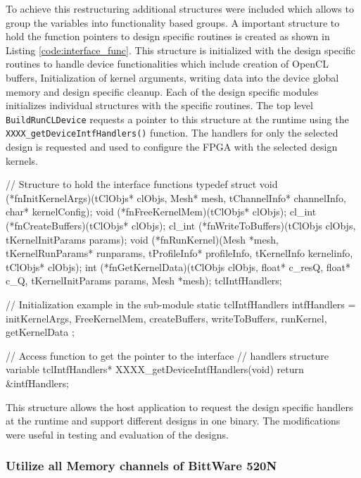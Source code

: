To achieve this restructuring additional structures were included which allows to
group the variables into functionality based groups. A important structure
to hold the function pointers to design specific routines is created
as shown in Listing \ref{code:interface_func}. This structure is initialized
with the design specific routines to handle device functionalities which
include creation of OpenCL buffers, Initialization of kernel arguments,
writing data into the device global memory and design specific cleanup.
Each of the design specific modules initializes individual structures
with the specific routines. The top level \texttt{BuildRunCLDevice} requests
a pointer to this structure at the runtime using the \texttt{XXXX\_getDeviceIntfHandlers()}
function. The handlers for only the selected design is requested and used to configure the
FPGA with the selected design kernels.
\begin{CppCode}[caption=Structure to hold the design specific interface function pointers
    and initialization example, frame=tlrb, label=code:interface_func, float]
// Structure to hold the interface functions
typedef struct
{
    void (*fnInitKernelArgs)(tClObjs* clObjs, Mesh* mesh, tChannelInfo* channelInfo,
                             char* kernelConfig);
    void (*fnFreeKernelMem)(tClObjs* clObjs);
    cl_int (*fnCreateBuffers)(tClObjs* clObjs);
    cl_int (*fnWriteToBuffers)(tClObjs clObjs, tKernelInitParams params);
    void (*fnRunKernel)(Mesh *mesh, tKernelRunParams* runparams, tProfileInfo* profileInfo,
                        tKernelInfo kernelinfo, tClObjs* clObjs);
    int (*fnGetKernelData)(tClObjs clObjs, float* c_resQ, float* c_Q,
                           tKernelInitParams params, Mesh *mesh);
} tclIntfHandlers;

// Initialization example in the sub-module
static tclIntfHandlers intfHandlers =
{
    initKernelArgs,
    FreeKernelMem,
    createBuffers,
    writeToBuffers,
    runKernel,
    getKernelData
};

// Access function to get the pointer to the interface
// handlers structure variable
tclIntfHandlers* XXXX_getDeviceIntfHandlers(void)
{
    return &intfHandlers;
}
\end{CppCode}

This structure allows the host application to request the design specific handlers at the
runtime and support different designs in one binary. The modifications were useful in testing
and evaluation of the designs.

\subsubsection*{Utilize all Memory channels of BittWare 520N}

